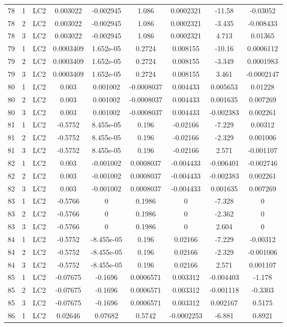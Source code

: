 \documentclass{article}%
\begin{document}
\begin{longtable}{| c c c | c c c c c c |}
78&1&LC2&0.003022&{-}0.002945&1.086&0.0002321&{-}11.58&{-}0.03052\\%
78&2&LC2&0.003022&{-}0.002945&1.086&0.0002321&{-}3.435&{-}0.008433\\%
78&3&LC2&0.003022&{-}0.002945&1.086&0.0002321&4.713&0.01365\\%
79&1&LC2&0.0003409&1.652e{-}05&0.2724&0.008155&{-}10.16&0.0006112\\%
79&2&LC2&0.0003409&1.652e{-}05&0.2724&0.008155&{-}3.349&0.0001983\\%
79&3&LC2&0.0003409&1.652e{-}05&0.2724&0.008155&3.461&{-}0.0002147\\%
80&1&LC2&0.003&0.001002&{-}0.0008037&0.004433&0.005653&0.01228\\%
80&2&LC2&0.003&0.001002&{-}0.0008037&0.004433&0.001635&0.007269\\%
80&3&LC2&0.003&0.001002&{-}0.0008037&0.004433&{-}0.002383&0.002261\\%
81&1&LC2&{-}0.5752&8.455e{-}05&0.196&{-}0.02166&{-}7.229&0.00312\\%
81&2&LC2&{-}0.5752&8.455e{-}05&0.196&{-}0.02166&{-}2.329&0.001006\\%
81&3&LC2&{-}0.5752&8.455e{-}05&0.196&{-}0.02166&2.571&{-}0.001107\\%
82&1&LC2&0.003&{-}0.001002&0.0008037&{-}0.004433&{-}0.006401&{-}0.002746\\%
82&2&LC2&0.003&{-}0.001002&0.0008037&{-}0.004433&{-}0.002383&0.002261\\%
82&3&LC2&0.003&{-}0.001002&0.0008037&{-}0.004433&0.001635&0.007269\\%
83&1&LC2&{-}0.5766&0&0.1986&0&{-}7.328&0\\%
83&2&LC2&{-}0.5766&0&0.1986&0&{-}2.362&0\\%
83&3&LC2&{-}0.5766&0&0.1986&0&2.604&0\\%
84&1&LC2&{-}0.5752&{-}8.455e{-}05&0.196&0.02166&{-}7.229&{-}0.00312\\%
84&2&LC2&{-}0.5752&{-}8.455e{-}05&0.196&0.02166&{-}2.329&{-}0.001006\\%
84&3&LC2&{-}0.5752&{-}8.455e{-}05&0.196&0.02166&2.571&0.001107\\%
85&1&LC2&{-}0.07675&{-}0.1696&0.0006571&0.003312&{-}0.004403&{-}1.178\\%
85&2&LC2&{-}0.07675&{-}0.1696&0.0006571&0.003312&{-}0.001118&{-}0.3303\\%
85&3&LC2&{-}0.07675&{-}0.1696&0.0006571&0.003312&0.002167&0.5175\\%
86&1&LC2&0.02646&0.07682&0.5742&{-}0.0002253&{-}6.881&0.8921\\%

\end{longtable}
\end{document}
